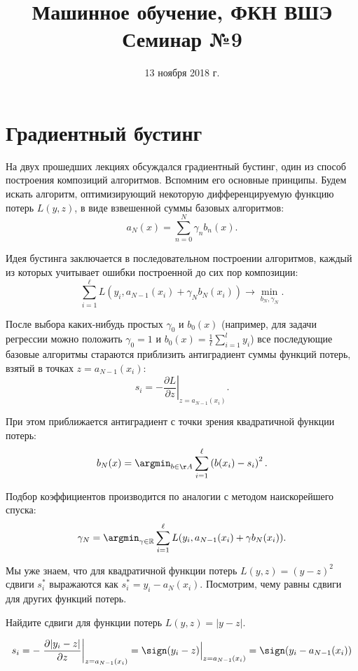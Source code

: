 \documentclass[12pt,fleqn]{article}
\title{Машинное обучение, ФКН ВШЭ\\Семинар №9}
\author{}
\date{13 ноября 2018 г.}
\begin{document}
\maketitle


\section{Градиентный бустинг}

На двух прошедших лекциях обсуждался градиентный бустинг, один из способ построения композиций алгоритмов. Вспомним его основные принципы. Будем искать алгоритм, оптимизирующий некоторую дифференцируемую функцию потерь $L(y, z)$, в виде взвешенной суммы базовых алгоритмов:
\[
    a_N(x)
    =
    \sum_{n = 0}^{N}
        \gamma_n b_n(x).
\]

Идея бустинга заключается в последовательном построении алгоритмов, каждый из которых учитывает ошибки построенной до сих пор композиции:
\[
    \sum_{i = 1}^{\ell}
        L(y_i, a_{N - 1}(x_i) + \gamma_N b_N(x_i))
    \to
    \min_{b_N, \gamma_N}.
\]

После выбора каких-нибудь простых $\gamma_0$ и $b_0(x)$ (например, для задачи регрессии можно положить $\gamma_0 = 1$ и $b_0(x) = \frac 1\ell \sum_{i=1}^l y_i$) все последующие базовые алгоритмы стараются приблизить антиградиент суммы функций потерь, взятый в точках $z = a_{N - 1}(x_i)$:
\[
    s_i
    =
    -
    \left.
    \frac{\partial L}{\partial z}
    \right|_{z = a_{N - 1}(x_i)}.
\]

При этом приближается антиградиент с точки зрения квадратичной функции потерь:
\[
    b_N(x)
    =
    \argmin_{b \in \AA}
        \sum_{i = 1}^{\ell}
            \left(
                b(x_i) - s_i
            \right)^2.
\]

Подбор коэффициентов производится по аналогии с методом наискорейшего спуска:
\[
    \gamma_N = \argmin_{\gamma \in \mathbb{R}}\sum_{i=1}^{\ell} L(y_i, a_{N-1}(x_i) + 
        \gamma b_N (x_i)).
\]

Мы уже знаем, что для квадратичной функции потерь $L(y, z) = 
(y - z)^2$ сдвиги $s_i^*$ выражаются как $s_i^* = y_i - a_N(x_i)$. Посмотрим, 
чему равны сдвиги для других функций потерь.

\begin{vkProblem}
Найдите сдвиги для функции потерь $L(y, z) = |y - z|$.
\end{vkProblem}
\begin{esSolution}

\[
    s_i = - \left. \frac{\partial |y_i - z|}{\partial 
        z} \right|_{z=a_{N-1}(x_i)} = 
    \Bigl. \sign(y_i - z) \Bigr|_{z=a_{N-1}(x_i)} =
    \sign(y_i - a_{N-1}(x_i))
\]

\end{esSolution}
\end{document}
